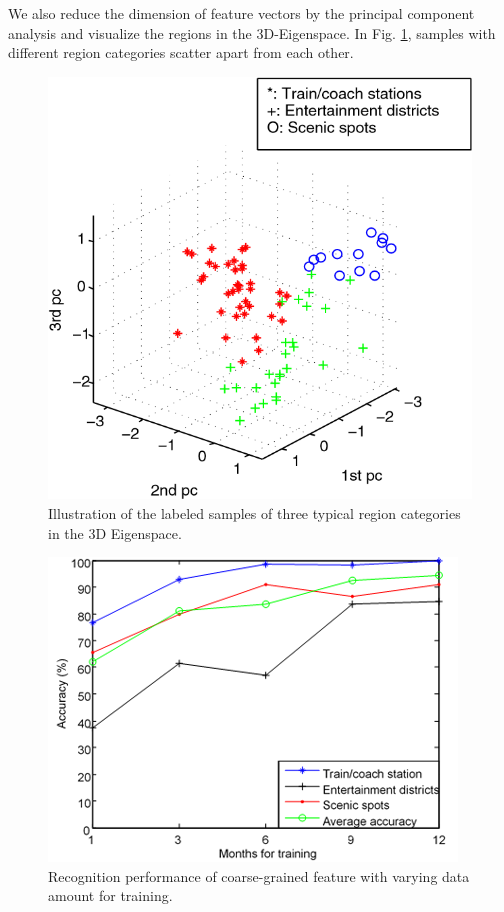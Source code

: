 \documentclass[a4paper, 10pt, conference]{ieeeconf}      %
\begin{document}
We also reduce the dimension of feature vectors by the principal component analysis and visualize the regions in the 3D-Eigenspace. In Fig. \ref{fig:my_label_4}, samples with different region categories scatter apart from each other.

\begin{figure}[thbp]
    \centering
    \includegraphics{fig/f6.png}
    \caption{Illustration of the labeled samples of three typical region categories in the 3D Eigenspace.}
    \label{fig:my_label_4}
\end{figure}
\begin{figure}[htbp]
    \centering
    \includegraphics{fig/f7.png}
    \caption{Recognition performance of coarse-grained feature with varying data amount for training.}
    \label{fig:my_label_5}
\end{figure}
\end{document}
